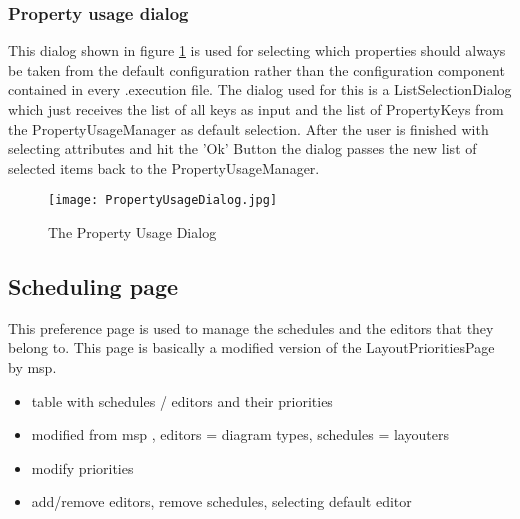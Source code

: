 \subsubsection{Property usage dialog}
This dialog shown in figure \ref{fig:PropertyUsageDialog} is used for selecting which properties should always be taken
from the default configuration rather than the configuration component contained
in every .execution file.
The dialog used for this is a ListSelectionDialog which just receives the list of
all keys as input and the list of PropertyKeys from the PropertyUsageManager as default selection.
After the user is finished with selecting attributes and hit the 'Ok' Button the dialog
passes the new list of selected items back to the PropertyUsageManager.
\begin{figure}[PropertyUsageDialog]
  \centering
  \texttt{[image: PropertyUsageDialog.jpg]}
  \caption[Property Usage Dialog]%
  {The Property Usage Dialog\protect}
  \label{fig:PropertyUsageDialog}
\end{figure}

\subsection{Scheduling page}
This preference page is used to manage the schedules and the editors that they belong to.
This page is basically a modified version of the LayoutPrioritiesPage by msp.

\begin{itemize}
 \item table with schedules / editors and their priorities
 \item modified from msp , editors = diagram types, schedules = layouters
 \item modify priorities
 \item add/remove editors, remove schedules, selecting default editor
\end{itemize}

